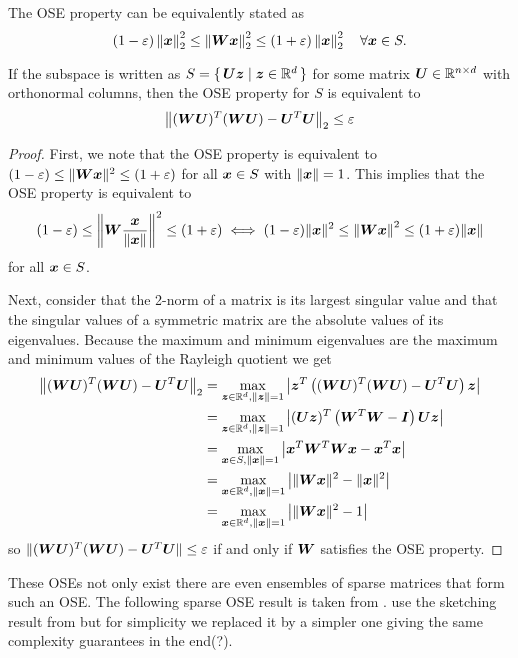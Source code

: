 \begin{theorem}
The OSE property can be equivalently stated as
\[ (1-\varepsilon) \left\lVert \bm{x} \right\rVert_2^2 \leq \left\lVert \bm{W}\bm{x} \right\rVert_2^2 \leq (1+\varepsilon) \left\lVert \bm{x} \right\rVert_2^2 \quad \forall \bm{x} \in S. \label{eqn:ose-inequality} \]

If the subspace is written as \(S = \set{ \bm{U}\bm{z} | \bm{z} \in \mathbb{R}^d }\) for some matrix \(\bm{U} \in \mathbb{R}^{n \times d}\) with orthonormal columns, then the OSE property for \(S\) is equivalent to
\[ \left\lVert (\bm{W}\bm{U})^T (\bm{W} \bm{U}) - \bm{U}^T \bm{U} \right\rVert_2 \leq \varepsilon \] 
\end{theorem}
\begin{proof}
First, we note that the OSE property is equivalent to \((1-\varepsilon) \leq \lVert \bm{W}\bm{x} \rVert^2 \leq (1+\varepsilon)\) for all \(\bm{x} \in S\) with \(\lVert \bm{x} \rVert = 1\).
This implies that the OSE property is equivalent to
\[     (1-\varepsilon) \leq \left\lVert \bm{W}\frac{\bm{x}}{\lVert \bm{x} \rVert} \right\rVert^2 \leq (1+\varepsilon)
  \iff (1-\varepsilon)\lVert \bm{x} \rVert^2 \leq \left\lVert \bm{W}\bm{x} \right\rVert^2 \leq (1+\varepsilon)\lVert \bm{x} \rVert
\]
for all \(\bm{x} \in S\).

Next, consider that the 2-norm of a matrix is its largest singular value and that the singular values of a symmetric matrix are the absolute values of its eigenvalues. 
Because the maximum and minimum eigenvalues are the maximum and minimum values of the Rayleigh quotient we get
\begin{align*}
  \left\lVert (\bm{W}\bm{U})^T (\bm{W} \bm{U}) - \bm{U}^T \bm{U} \right\rVert_2
  &= \max_{\bm{z} \in \mathbb{R}^d, \lVert \bm{z} \rVert=1} \left\lvert \bm{z}^T \left( (\bm{W}\bm{U})^T (\bm{W} \bm{U}) - \bm{U}^T \bm{U} \right) \bm{z} \right\rvert \\
  &= \max_{\bm{z} \in \mathbb{R}^d, \lVert \bm{z} \rVert=1} \left\lvert (\bm{U}\bm{z})^T \left( \bm{W}^T \bm{W} - \bm{I} \right) \bm{U}\bm{z} \right\rvert \\
  &= \max_{\bm{x} \in S, \lVert \bm{x} \rVert=1} \left\lvert \bm{x}^T \bm{W}^T \bm{W} \bm{x} - \bm{x}^T \bm{x} \right\rvert \\
  &= \max_{\bm{x} \in \mathbb{R}^d, \lVert \bm{x} \rVert=1} \left\lvert \lVert \bm{W}\bm{x} \rVert^2 - \lVert \bm{x} \rVert^2 \right\rvert \\
  &= \max_{\bm{x} \in \mathbb{R}^d, \lVert \bm{x} \rVert=1} \left\lvert \lVert \bm{W}\bm{x} \rVert^2 - 1 \right\rvert
\end{align*}
so \(\lVert (\bm{W}\bm{U})^T (\bm{W}\bm{U}) - \bm{U}^T \bm{U} \rVert \leq \varepsilon\) if and only if \(\bm{W}\) satisfies the OSE property.
\end{proof}

These OSEs not only exist there are even ensembles of sparse matrices that form such an OSE.
The following sparse OSE result is taken from \cite{Cohen-NearlyTightObliviousSubspaceEmbeddings}.
\Textcite{Avron-FasterRandomizedInfeasibleIPMs} use the sketching result from \cite{Cohen-OptimalApproximateMatrixProduct} but for simplicity we replaced it by a simpler one giving the same complexity guarantees in the end(?).

